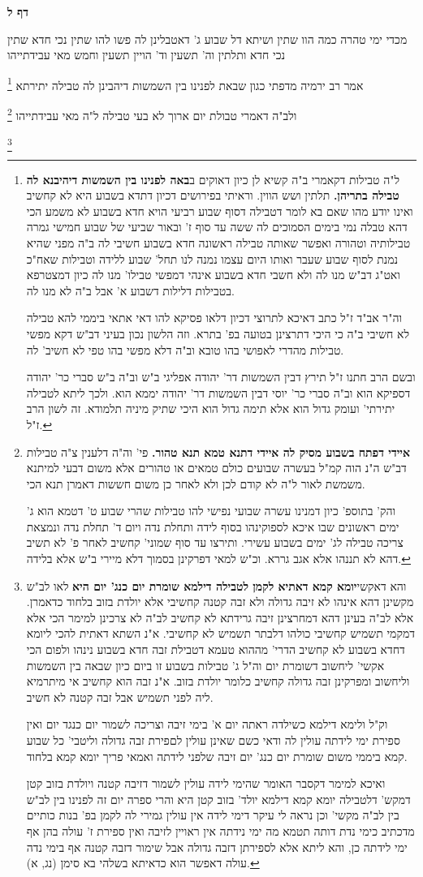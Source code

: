 \documentclass[12pt, openany]{book}
\newcommand{\sethebfont}{
\fontsize{10.5pt}{21.0pt} \selectfont
}
\newcommand{\twocol}[1]{
	{\sethebfont \begin{multicols}{2}
			#1
	\end{multicols}}	
}
\newcommand{\sectname}{}
\newcommand{\newsection}[1]{
	\addcontentsline{toc}{section}{#1}
	\renewcommand{\sectname}{#1}	
	\vspace{-\baselineskip}
	\begin{center}
		\textbf{%
\fontsize{16pt}{16pt}\selectfont
			#1}
	\end{center}
	\vspace{-\baselineskip}
	\nopagebreak
}
\newcommand{\footnotecomment}[1]{
	\renewcommand\thefootnote{}
	\footnote{#1}}
\newcommand{\commenta}[1]{\footnotecomment{#1}}
\begin{document}
\newsection{דף ל}
\twocol{מכדי ימי טהרה כמה הוו שתין ושיתא דל שבוע ג' דאטבלינן לה פשו להו שתין נכי חדא שתין נכי חדא ותלתין וה' תשעין וד' הויין תשעין וחמש מאי עבידתייהו 
\commenta{ ל"ה טבילות דקאמרי ב"ה קשיא לן כיון דאוקים ב\textbf{באה לפנינו בין השמשות דיהיבנא לה טבילה בתריהן.} תלתין ושש הווין. וראיתי בפירושים דכיון דתדא בשבוע היא לא קחשיב ואינו יודע מהו שאם בא לומר דטבילה דסוף שבוע רביעי הויא חדא בשבוע לא משמע הכי דהא טבלה נמי בימים הסמוכים לה ששה עד סוף ז' ובאור שביעי של שבוע חמישי גמרה טבילותיה וטהורה ואפשר שאותה טבילה ראשונה חדא בשבוע חשיבי לה ב"ה מפני שהיא נמנת לסוף שבוע שעבר ואותו היום עצמו נמנה לנו תחל' שבוע ללידה וטבילות שאח"כ ואט"ג דב"ש מנו לה ולא חשבי חדא בשבוע אינהי דמפשי טבילו' מנו לה כיון דמצטרפא בטבילות דלילות דשבוע א' אבל ב"ה לא מנו לה.\par וה"ר אב"ד ז"ל כתב דאיכא לתרוצי דכיון דלאו פסיקא להו דאי אתאי ביממי להא טבילה לא חשיבי ב"ה כי היכי דתרצינן בטועה בפ' בתרא. וזה הלשון נכון בעיני דב"ש דקא מפשי טבילות מהדרי לאפושי בהו טובא וב"ה דלא מפשי בהו טפי לא חשיב' לה.\par ובשם הרב חתנו ז"ל תירץ דבין השמשות דר' יהודה אפליגי ב"ש וב"ה ב"ש סברי כר' יהודה דספיקא הוא וב"ה סברי כר' יוסי דבין השמשות דר' יהודה יממא הוא. ולכך ליתא לטבילה יתירתי' ועומק גדול הוא אלא תימה גדול הוא היכי שתיק מיניה תלמודא. זה לשון הרב ז"ל. }
אמר רב ירמיה מדפתי כגון שבאת לפנינו בין השמשות דיהבינן לה טבילה יתירתא 
\commenta{\textbf{איידי דפתח בשבוע מסיק לה איידי דתנא טמא תנא טהור.} פי' וה"ה דלענין צ"ה טבילות דב"ש ה"נ הוה קמ"ל בעשרה שבועים כולם טמאים או טהורים אלא משום דבעי למיתנא משמשת לאור ל"ה לא קודם לכן ולא לאחר כן משום חששות דאמרן תנא הכי.\par והק' בתוספ' כיון דמנינו עשרה שבועי נפישי להו טבילות שהרי שבוע ט' דטמא הוא ג' ימים ראשונים שבו איכא לספוקינהו בסוף לידה ותחלת נדה ויום ד' תחלת נדה ונמצאת צריכה טבילה לג' ימים בשבוע עשירי. ותירצו עד סוף שמוני' קחשיב לאחר פ' לא תשיב דהא לא תננהו אלא אגב גררא. וכ"ש למאי דפרקינן בסמוך דלא מיירי ב"ש אלא בלידה. }
ולב"ה דאמרי טבולת יום ארוך לא בעי טבילה ל"ה מאי עבידתייהו 
\commenta{ והא דאקשי\textbf{יומא קמא דאתיא לקמן לטבילה דילמא שומרת יום כנג' יום היא} לאו לב"ש מקשינן דהא אינהו לא זיבה גדולה ולא זבה קטנה קחשיבי אלא יולדת בזוב בלחוד כדאמרן. אלא לב"ה בעינן דהא דמחרצינן זיבה גרידתא לא קחשיב לב"ה לא צרכינן למימר הכי אלא דמקמי תשמיש קחשיבי כולהו דלבתר תשמיש לא קחשיבי. א"נ השתא דאתית להכי ליומא דחדא בשבוע לא קחשיב הדרי' מההוא טעמא דטבילת זבה חדא בשבוע נינהו ולפום הכי אקשי' ליחשוב דשומרת יום וה"ל ג' טבילות בשבוע זו ביום כיון שבאה בין השמשות וליחשוב ומפרקינן זבה גדולה קחשיב כלומר יולדת בזוב. א"נ זבה הוא קחשיב אי מיתרמיא ליה לפני תשמיש אבל זבה קטנה לא חשיב.\par וק"ל ולימא דילמא כשילדה ראתה יום א' בימי זיבה וצריכה לשמור יום כנגד יום ואין ספירת ימי לידתה עולין לה ודאי כשם שאינן עולין לםפירת זבה גדולה וליטבי' כל שבוע קמא ביממי משום שומרת יום כנג' יום זיבה שלפני לידתה ואמאי פריך יומא קמא בלחוד.\par ואיכא למימר דקסבר האומר שהימי לידה עולין לשמור דזיבה קטנה ויולדת בזוב קטן דמקש' דלטבילה יומא קמא דילמא יולד' בזוב קטן היא והרי ספרה יום זה לפנינו בין לב"ש בין לב"ה מקשי' וכן נראה לי עיקר דימי לידה אין עולין גמירי לה לקמן בפ' בנות כותיים מדכתיב כימי נדת דותה תטמא מה ימי נידתה אין ראויין לזיבה ואין ספירת ז' עולה בהן אף ימי לידתה כן, והא ליתא אלא לספירתן דזבה גדולה אבל שימור דזבה קטנה אף בימי נדה עולה דאפשר הוא כדאיתא בשלהי בא סימן (נג, א). }
}
\end{document}
